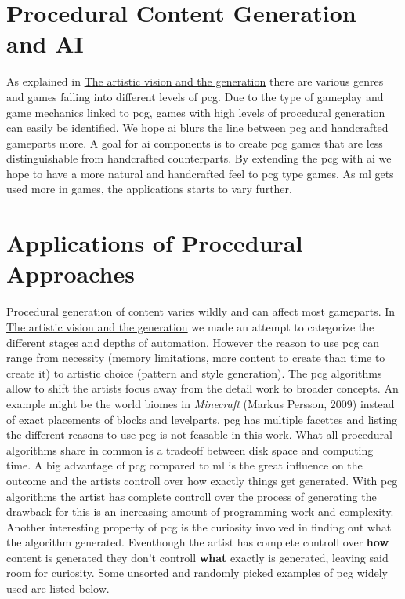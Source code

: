 \documentclass[10pt,a4paper]{article}
\begin{document}
\section{Procedural Content Generation and AI}
As explained in \hyperref[sec:visionVSgeneration]{The artistic vision and the generation} there are various genres and games falling into different levels of \gls{pcg}. Due to the type of gameplay and game mechanics linked to \gls{pcg}, games with high levels of procedural generation can easily be identified. We hope \gls{ai} blurs the line between \gls{pcg} and handcrafted gameparts more. A goal for \gls{ai} components is to create \gls{pcg} games that are less distinguishable from handcrafted counterparts. By extending the \gls{pcg} with \gls{ai} we hope to have a more natural and handcrafted feel to \gls{pcg} type games. As \gls{ml} gets used more in games, the applications starts to vary further.

\section{Applications of Procedural Approaches}
Procedural generation of content varies wildly and can affect most gameparts. In \hyperref[sec:visionVSgeneration]{The artistic vision and the generation} we made an attempt to categorize the different stages and depths of automation. However the reason to use \gls{pcg} can range from necessity (memory limitations, more content to create than time to create it) to artistic choice (pattern and style generation). The \gls{pcg} algorithms allow to shift the artists focus away from the detail work to broader concepts. An example might be the world biomes in \textit{Minecraft} (Markus Persson, 2009) instead of exact placements of blocks and levelparts. \gls{pcg} has multiple facettes and listing the different reasons to use \gls{pcg} is not feasable in this work. What all procedural algorithms share in common is a tradeoff between disk space and computing time. A big advantage of \gls{pcg} compared to \gls{ml} is the great influence on the outcome and the artists controll over how exactly things get generated. With \gls{pcg} algorithms the artist has complete controll over the process of generating the drawback for this is an increasing amount of programming work and complexity. Another interesting property of \gls{pcg} is the curiosity involved in finding out what the algorithm generated. Eventhough the artist has complete controll over \textbf{how} content is generated they don't controll \textbf{what} exactly is generated, leaving said room for curiosity. Some unsorted and randomly picked examples of \gls{pcg} widely used are listed below.
\end{document}
